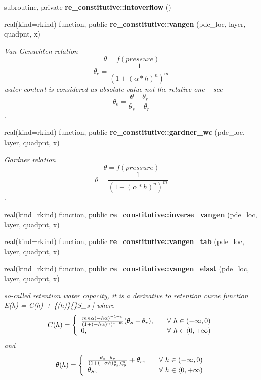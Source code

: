 \begin{DoxyCompactItemize}
\item 
subroutine, private {\bf re\+\_\+constitutive\+::intoverflow} ()
\item 
real(kind=rkind) function, public {\bf re\+\_\+constitutive\+::vangen} (pde\+\_\+loc, layer, quadpnt, x)
\begin{DoxyCompactList}\small\item\em Van Genuchten relation \[ \theta = f(pressure) \] \[ \theta_e = \frac{1}{(1+(\alpha*h)^n)^m} \] water content is considered as absolute value not the relative one ~\newline
 see \[ \theta_e = \frac{\theta - \theta_r}{\theta_s-\theta_r} \]. \end{DoxyCompactList}\item 
real(kind=rkind) function, public {\bf re\+\_\+constitutive\+::gardner\+\_\+wc} (pde\+\_\+loc, layer, quadpnt, x)
\begin{DoxyCompactList}\small\item\em Gardner relation \[ \theta = f(pressure) \] \[ \theta = \frac{1}{(1+(\alpha*h)^n)^m} \]. \end{DoxyCompactList}\item 
real(kind=rkind) function, public {\bf re\+\_\+constitutive\+::inverse\+\_\+vangen} (pde\+\_\+loc, layer, quadpnt, x)
\item 
real(kind=rkind) function, public {\bf re\+\_\+constitutive\+::vangen\+\_\+tab} (pde\+\_\+loc, layer, quadpnt, x)
\item 
real(kind=rkind) function, public {\bf re\+\_\+constitutive\+::vangen\+\_\+elast} (pde\+\_\+loc, layer, quadpnt, x)
\begin{DoxyCompactList}\small\item\em so-\/called retention water capacity, it is a derivative to retention curve function  E(h) = C(h) + \{(h)\}\{\}S\+\_\+s ] where \[ C(h) = \left\{ \begin{array}{l l}\frac{m n \alpha (-h \alpha )^{-1+n}}{\left(1+(-h \alpha )^n\right)^{1+m}}(\theta_s - \theta_r) , & \quad \mbox{$\forall$ $h \in (-\infty, 0 )$}\\ 0, & \quad \mbox{$\forall$ $h \in \langle 0, + \infty )$}\\ \end{array} \right. \] and \[ \theta(h) = \left\{ \begin{array}{l l} \frac{\theta_s -\theta_r}{(1+(-\alpha h)^n_{vg})^m_{vg}} + \theta_r, & \quad \mbox{$\forall$ $h \in (-\infty, 0 )$}\\ \theta_S, & \quad \mbox{$\forall$ $h \in \langle 0, + \infty )$}\\ \end{array} \right. \] \end{DoxyCompactList}\item 

\end{DoxyCompactItemize}
